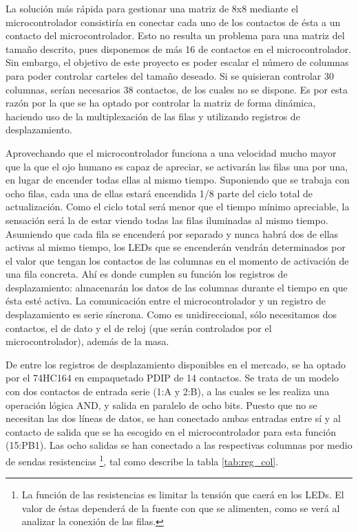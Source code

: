 La solución más rápida para gestionar una matriz de 8x8 mediante el microcontrolador consistiría en conectar cada uno de los contactos de ésta a un contacto del microcontrolador. Esto no resulta un problema para una matriz del tamaño descrito, pues disponemos de más 16 de contactos en el microcontrolador. Sin embargo, el objetivo de este proyecto es poder escalar el número de columnas para poder controlar carteles del tamaño deseado. Si se quisieran controlar 30 columnas, serían necesarios 38 contactos, de los cuales no se dispone. Es por esta razón por la que se ha optado por controlar la matriz de forma dinámica, haciendo uso de la multiplexación de las filas y utilizando registros de desplazamiento\cite{shiftr}.

Aprovechando que el microcontrolador funciona a una velocidad mucho mayor que la que el ojo humano es capaz de apreciar, se activarán las filas una por una, en lugar de encender todas ellas al mismo tiempo. Suponiendo que se trabaja con ocho filas, cada una de ellas estará encendida 1/8 parte del ciclo total de actualización. Como el ciclo total será menor que el tiempo mínimo apreciable, la sensación será la de estar viendo todas las filas iluminadas al mismo tiempo. Asumiendo que cada fila se encenderá por separado y nunca habrá dos de ellas activas al mismo tiempo, los LEDs que se encenderán vendrán determinados por el valor que tengan los contactos de las columnas en el momento de activación de una fila concreta. Ahí es donde cumplen su función los registros de desplazamiento: almacenarán los datos de las columnas durante el tiempo en que ésta esté activa. La comunicación entre el microcontrolador y un registro de desplazamiento es serie síncrona. Como es unidireccional, sólo necesitamos dos contactos, el de dato y el de reloj (que serán controlados por el microcontrolador), además de la masa.

De entre los registros de desplazamiento disponibles en el mercado, se ha optado por el 74HC164 \cite{164} en empaquetado PDIP de 14 contactos. Se trata de un modelo con dos contactos de entrada serie (1:A y 2:B), a las cuales se les realiza una operación lógica AND, y salida en paralelo de ocho bits. Puesto que no se necesitan las dos líneas de datos, se han conectado ambas entradas entre sí y al contacto de salida que se ha escogido en el microcontrolador para esta función (15:PB1). Las ocho salidas se han conectado a las respectivas columnas por medio de sendas resistencias \footnote{La función de las resistencias es limitar la tensión que caerá en los LEDs. El valor de éstas dependerá de la fuente con que se alimenten, como se verá al analizar la conexión de las filas.}, tal como describe la tabla \ref{tab:reg_col}.

